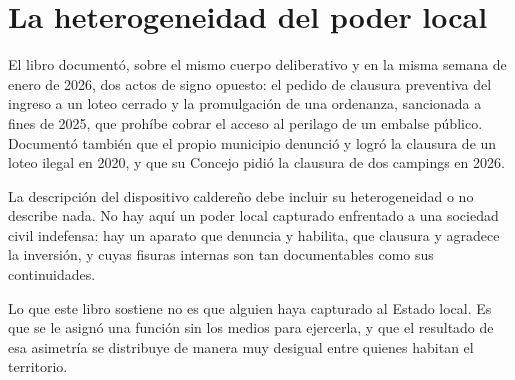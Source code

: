 \section{La heterogeneidad del poder local}

El libro documentó, sobre el mismo cuerpo deliberativo y en la misma semana de enero de 2026, dos actos de signo opuesto: el pedido de clausura preventiva del ingreso a un loteo cerrado y la promulgación de una ordenanza, sancionada a fines de 2025, que prohíbe cobrar el acceso al perilago de un embalse público. Documentó también que el propio municipio denunció y logró la clausura de un loteo ilegal en 2020, y que su Concejo pidió la clausura de dos campings en 2026.

La descripción del dispositivo caldereño debe incluir su heterogeneidad o no describe nada. No hay aquí un poder local capturado enfrentado a una sociedad civil indefensa: hay un aparato que denuncia y habilita, que clausura y agradece la inversión, y cuyas fisuras internas son tan documentables como sus continuidades.

Lo que este libro sostiene no es que alguien haya capturado al Estado local. Es que se le asignó una función sin los medios para ejercerla, y que el resultado de esa asimetría se distribuye de manera muy desigual entre quienes habitan el territorio.


